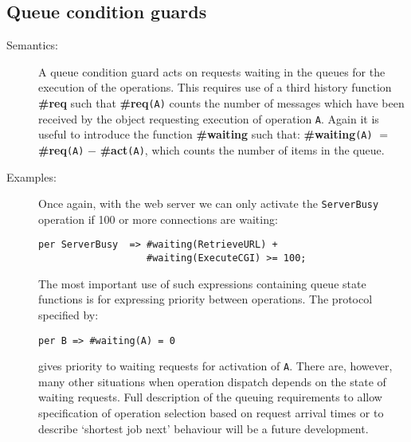 \documentclass{overturerepchap}
\begin{document}
{\begin{description}
%
\end{description}


\subsection{Queue condition guards}\label{queuesec}
\begin{description}
\item[Semantics:]
A queue condition guard acts on requests waiting in the queues for the
execution of the operations.
This requires use of a third history function {\bf\ttfamily \#req} such that
{\bf\ttfamily \#req}{\tt (A)} counts the number of messages which have been received by the
object requesting execution of operation {\tt A}.
Again it is useful to introduce the function {\bf\ttfamily \#waiting} such that:
{\bf\ttfamily \#waiting}{\tt (A}{\tt )} $=$ {\bf\ttfamily \#req}{\tt (A}{\tt )} $-$ {\bf\ttfamily \#act}{\tt (A}{\tt )},
which counts the number of items in the queue.

\item[Examples:]
Once again, with the web server we can only activate the
\texttt{ServerBusy} operation if 100 or more connections are waiting:
\begin{lstlisting}
per ServerBusy  => #waiting(RetrieveURL) +
                   #waiting(ExecuteCGI) >= 100;
\end{lstlisting}

The most important use of such expressions containing queue
state functions is for expressing priority between operations. The
protocol specified by:
\begin{lstlisting}
per B => #waiting(A) = 0
\end{lstlisting}
gives priority to waiting  requests for activation of {\tt A}. There
are, however, many other situations when operation dispatch depends on
the state of waiting requests.  Full description of the queuing
requirements to allow specification of operation selection based on
request arrival times or to describe `shortest job next' behaviour
will be a future development.


\end{description}}
\end{document}
